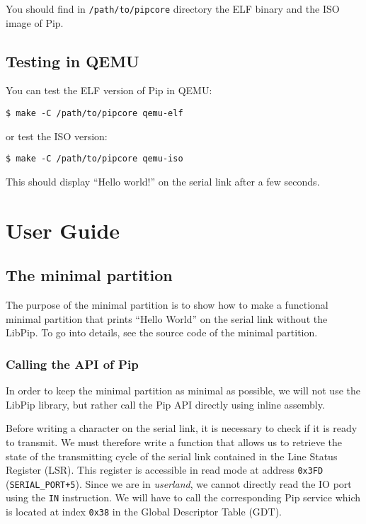 \documentclass[10pt,a4paper,titlepage]{refart}
\begin{document}
You should find in \texttt{/path/to/pipcore} directory the ELF binary and the
ISO image of Pip.

\subsection{Testing in QEMU}

You can test the ELF version of Pip in QEMU:

\begin{lstlisting}[style=BashStyle]
    $ make -C /path/to/pipcore qemu-elf
\end{lstlisting}

or test the ISO version:

\begin{lstlisting}[style=BashStyle]
    $ make -C /path/to/pipcore qemu-iso
\end{lstlisting}

This should display ``Hello world!'' on the serial link after a few seconds.

\section{User Guide}

\subsection{The minimal partition}

The purpose of the minimal partition is to show how to make a functional minimal
partition that prints ``Hello World'' on the serial link without the LibPip. To
go into details, see the source code of the minimal partition.

\subsubsection{Calling the API of Pip}

In order to keep the minimal partition as minimal as possible, we will not use
the LibPip library, but rather call the Pip API directly using inline assembly.

Before writing a character on the serial link, it is necessary to check if it is
ready to transmit. We must therefore write a function that allows us to retrieve
the state of the transmitting cycle of the serial link contained in the Line
Status Register (LSR). This register is accessible in read mode at address
\texttt{0x3FD} (\texttt{SERIAL\_PORT+5}). Since we are in \textit{userland}, we
cannot directly read the IO port using the \texttt{IN} instruction. We will have
to call the corresponding Pip service which is located at index \texttt{0x38}
in the Global Descriptor Table (GDT).
\end{document}
